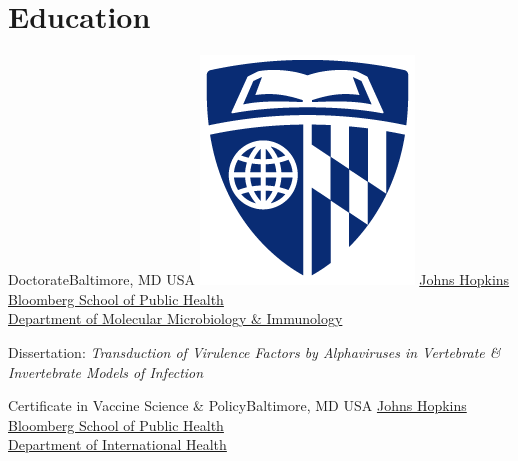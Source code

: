 \documentclass[letterpaper]{twentysecond-charactersheet}
\begin{document}
\section{Education}

		{Doctorate}{Baltimore, MD USA}%
		{\includegraphics[width=\logowidth]{img/JHU.png}}%
		{\href{http://www.jhsph.edu/departments/w-harry-feinstone-department-of-molecular-microbiology-and-immunology/}{Johns Hopkins Bloomberg School of Public Health\\Department of Molecular Microbiology \& Immunology}}%
        {\vspace{-24pt}\begin{itemize}{\item Dissertation: \emph{Transduction of Virulence Factors by Alphaviruses in Vertebrate \& Invertebrate Models of Infection}}\end{itemize}}%

        {Certificate in Vaccine Science \& Policy}{Baltimore, MD USA}{}%
        {\href{http://www.jhsph.edu/departments/international-health/}{Johns Hopkins Bloomberg School of Public Health\\Department of International Health}}{}%
\end{document}
